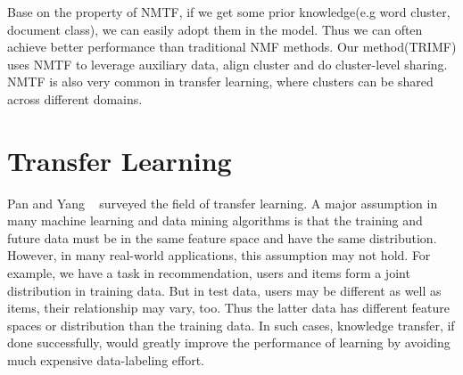 Base on the property of NMTF, if we get some prior knowledge(e.g word cluster, document class), we can easily adopt them in the model. Thus we can often achieve better performance than traditional NMF methods. Our method(TRIMF) uses NMTF to leverage auxiliary data, align cluster and do cluster-level sharing. NMTF is also very common in transfer learning, where clusters can be shared across different domains.


\hspace{0.1in}
\section{Transfer Learning} Pan and Yang ~\cite{/tkde/sinno09survey} surveyed the field of transfer learning. A major assumption in many machine learning and data mining algorithms is that the training and future data must be in the same feature space and have the same distribution. However, in many real-world applications, this assumption may not hold. For example, we have a task in recommendation, users and items form a joint distribution in training data. But in test data, users may be different as well as items, their relationship may vary, too. Thus the latter data has different feature spaces or distribution than the training data. In such cases, knowledge transfer, if done successfully, would greatly improve the performance of learning by avoiding much expensive data-labeling effort.

\hspace{0.05in}
